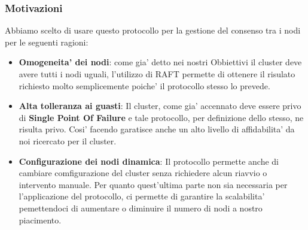 \subsubsection{Motivazioni}
Abbiamo scelto di usare questo protocollo per la gestione del consenso tra i nodi per
le seguenti ragioni:
\begin{itemize}
    \item \textbf{Omogeneita' dei nodi}: 
        come gia' detto nei nostri Obbiettivi il cluster deve avere tutti i nodi uguali, 
        l'utilizzo di RAFT permette di ottenere il risulato richiesto molto semplicemente poiche'
        il protocollo stesso lo prevede.
    \item \textbf{Alta tolleranza ai guasti}: 
        Il cluster, come gia' accennato deve essere privo di \textbf{Single Point Of Failure} e
        tale protocollo, per definizione dello stesso, ne risulta privo. 
        Cosi' facendo garatisce anche un alto livello di affidabilita' da noi ricercato per il 
        cluster.
    \item \textbf{Configurazione dei nodi dinamica}: 
        Il protocollo permette anche di cambiare comfigurazione del cluster senza richiedere
        alcun riavvio o intervento manuale. Per quanto quest'ultima
        parte non sia necessaria per l'applicazione del protocollo, ci permette di garantire
        la scalabilita' pemettendoci di aumentare o diminuire il numero di 
        nodi a nostro piacimento.
\end{itemize}

